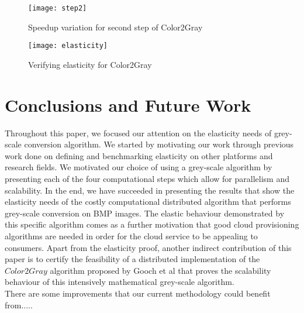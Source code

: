 \documentclass[conference]{IEEEtran}
\begin{document}
\begin{figure}
	\texttt{[image: step2]}
	\centering
	\caption{Speedup variation for second step of Color2Gray}
	\label{image:step2}
\end{figure}

\begin{figure}
	\caption{Verifying elasticity for Color2Gray}
	\texttt{[image: elasticity]}
	\label{image:elasticity}
	\centering
\end{figure}

\section{Conclusions and Future Work}
Throughout this paper, we focused our attention on the elasticity needs of grey-scale conversion algorithm. We started by motivating our work through previous work done on defining and benchmarking elasticity on other platforms and research fields. We motivated our choice of using a grey-scale algorithm by presenting each of the four computational steps which allow for parallelism and scalability. In the end, we have succeeded in presenting the results that show the elasticity needs of the costly computational distributed algorithm that performs grey-scale conversion on BMP images. The elastic behaviour demonstrated by this specific algorithm comes as a further motivation that good cloud provisioning algorithms are needed in order for the cloud service to be appealing to consumers. Apart from the elasticity proof, another indirect contribution of this paper is to certify the feasibility of a distributed implementation of the $\mathit{Color2Gray}$ algorithm proposed by Gooch et al \cite{gooch2005color2gray} that proves the scalability behaviour of this intensively mathematical grey-scale algorithm.\\
There are some improvements that our current methodology could benefit from.....


\end{document}
